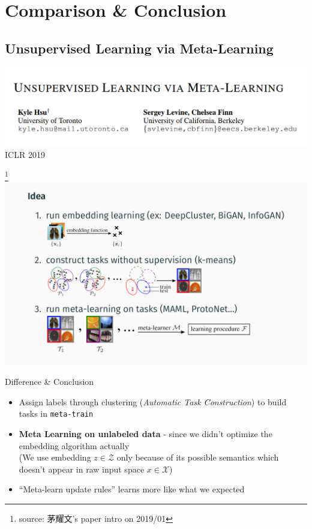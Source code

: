 \documentclass{beamer}
\begin{document}
\section{Comparison \& Conclusion}
\subsection{Unsupervised Learning via Meta-Learning}

\begin{frame}
  \includegraphics[width=\textwidth]{fig/ULML.png}
  \center ICLR 2019
\end{frame}

\begin{frame}
  \footnote{source: 茅耀文's paper intro on 2019/01}
  \includegraphics[width=\textwidth]{fig/ULML-flow.png}
\end{frame}

\begin{frame}{Difference \& Conclusion}
  \begin{itemize}
    \item Assign labels through clustering (\textit{Automatic Task Construction}) to build tasks in \texttt{meta-train}
    \item \textbf{Meta Learning on unlabeled data} - since we didn't optimize the embedding algorithm actually\\
      (We use embedding $z \in \mathcal{Z}$ only because of its possible semantics which doesn't appear in raw input space $x \in \mathcal{X}$)
    \item ``Meta-learn update rules'' learns more like what we expected
  \end{itemize}
\end{frame}
\end{document}
